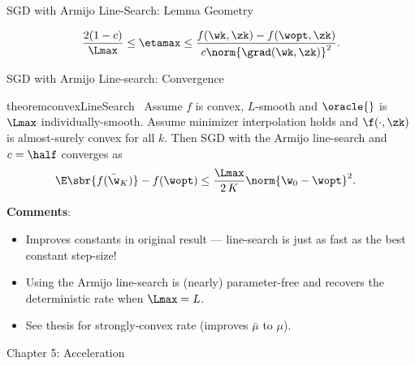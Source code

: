 \documentclass[mathserif,notheorems, hyperref={colorlinks, citecolor=blue, urlcolor=blue, linkcolor=blue}]{beamer}
\def\\{}%
\begin{document}
    \begin{frame}{SGD with Armijo Line-Search: Lemma Geometry}
        \Large

        \[  \frac{2 (1-c)}{\Lmax} \leq \etamax \leq \frac{f(\wk, \zk) - f(\wopt, \zk)}{c \norm{\grad(\wk, \zk)}^2}. \] 

        \vspace{1ex} 

        \begin{figure}[]
            \centering
            
        \end{figure} 

    \end{frame}

    \begin{frame}{SGD with Armijo Line-search: Convergence}
        \begin{restatable}{theorem}{convexLineSearch}~\label{thm:convex-line-search}
            Assume \( f \) is convex, \( L \)-smooth and \( \oracle{} \) is \( \Lmax \) individually-smooth.
            Assume minimizer interpolation holds and \( \f(\cdot, \zk) \) is almost-surely convex for all \( k \).
            Then SGD with the Armijo line-search and \( c = \half \) converges as 
            \begin{align*}
                \E\sbr{f(\bar \w_K)} - f(\wopt) &\leq \frac{\Lmax}{2 \, K} \norm{\w_0 - \wopt}^2.
            \end{align*} 
        \end{restatable}
        
        \textbf{Comments}:
        \begin{itemize}
            \item Improves constants in original result \citep{vaswani2019painless} ---
            line-search is just as fast as the best constant step-size! 
            \item Using the Armijo line-search is (nearly) parameter-free and recovers the deterministic rate when \( \Lmax = L \). 
            \item See thesis for strongly-convex rate (improves \( \bar \mu \) to \( \mu \)). 
        \end{itemize}

    \end{frame}



    \begin{frame}
       \begin{center}
          \huge Chapter 5: Acceleration \\
       \end{center} 
    \end{frame}
    
\end{document}
